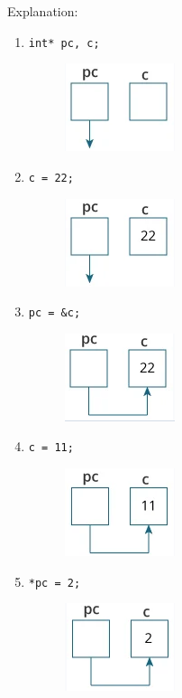 Explanation:\\
\begin{enumerate}
    \item \verb|int* pc, c;|
    \begin{figure}[H]
        \centering
        \includegraphics[width=0.2\linewidth]{../P4/img/screenshot001.png}
        \caption{}
        \label{fig:satu}
    \end{figure}
    \item \verb|c = 22;|
    \begin{figure}[H]
        \centering
        \includegraphics[width=0.2\linewidth]{../P4/img/screenshot002.png}
        \caption{}
        \label{fig:dua}
    \end{figure}
    \item \verb|pc = &c;|
    \begin{figure}[H]
        \centering
        \includegraphics[width=0.2\linewidth]{../P4/img/screenshot003.png}
        \caption{}
        \label{fig:tiga}
    \end{figure}
    \item \verb|c = 11;|
    \begin{figure}[H]
        \centering
        \includegraphics[width=0.2\linewidth]{../P4/img/screenshot004.png}
        \caption{}
        \label{fig:empat}
    \end{figure}
    \item \verb|*pc = 2;|
    \begin{figure}[H]
        \centering
        \includegraphics[width=0.2\linewidth]{../P4/img/screenshot005.png}
        \caption{}
        \label{fig:lima}
    \end{figure}
\end{enumerate}

